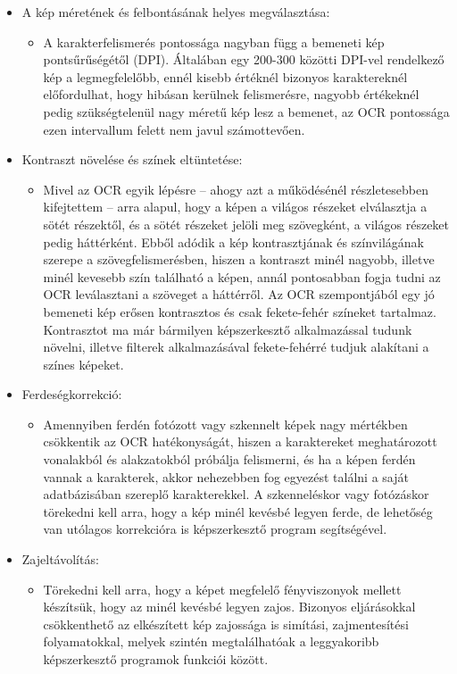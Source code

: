 \documentclass[12pt]{report}
\begin{document}
\begin{itemize}
    \item A kép méretének és felbontásának helyes megválasztása:
    \begin{itemize}
	   \item A karakterfelismerés pontossága nagyban függ a bemeneti kép pontsűrűségétől (DPI). Általában egy 200-300 közötti DPI-vel rendelkező kép a legmegfelelőbb, ennél kisebb értéknél bizonyos karaktereknél előfordulhat, hogy hibásan kerülnek felismerésre, nagyobb értékeknél pedig szükségtelenül nagy méretű kép lesz a bemenet, az OCR pontossága ezen intervallum felett nem javul számottevően.
    \end{itemize}
    \item Kontraszt növelése és színek eltüntetése:
    \begin{itemize}
	   \item Mivel az OCR egyik lépésre – ahogy azt a működésénél részletesebben kifejtettem –  arra alapul, hogy a képen a világos részeket elválasztja a sötét részektől, és a sötét részeket jelöli meg szövegként, a világos részeket pedig háttérként. Ebből adódik a kép kontrasztjának és színvilágának szerepe a szövegfelismerésben, hiszen a kontraszt minél nagyobb, illetve minél kevesebb szín található a képen, annál pontosabban fogja tudni az OCR leválasztani a szöveget a háttérről. Az OCR szempontjából egy jó bemeneti kép erősen kontrasztos és csak fekete-fehér színeket tartalmaz. Kontrasztot ma már bármilyen képszerkesztő alkalmazással tudunk növelni, illetve filterek alkalmazásával fekete-fehérré tudjuk alakítani a színes képeket.
    \end{itemize}
    \item Ferdeségkorrekció:
    \begin{itemize}
	   \item Amennyiben ferdén fotózott vagy szkennelt képek nagy mértékben csökkentik az OCR hatékonyságát, hiszen a karaktereket meghatározott vonalakból és alakzatokból próbálja felismerni, és ha a képen ferdén vannak a karakterek, akkor nehezebben fog egyezést találni a saját adatbázisában szereplő karakterekkel. A szkenneléskor vagy fotózáskor törekedni kell arra, hogy a kép minél kevésbé legyen ferde, de lehetőség van utólagos korrekcióra is képszerkesztő program segítségével.
    \end{itemize}
    \item Zajeltávolítás:
    \begin{itemize}
	   \item Törekedni kell arra, hogy a képet megfelelő fényviszonyok mellett készítsük, hogy az minél kevésbé legyen zajos. Bizonyos eljárásokkal csökkenthető az elkészített kép zajossága is simítási, zajmentesítési folyamatokkal, melyek szintén megtalálhatóak a leggyakoribb képszerkesztő programok funkciói között.
    \end{itemize}
\end{itemize}
\end{document}
